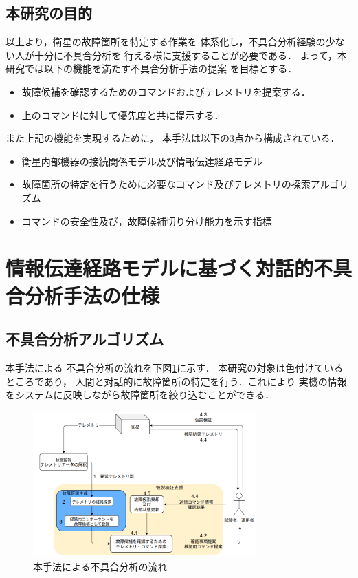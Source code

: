 \documentclass[11pt]{jsarticle}%
\begin{document}
\begin{multicols}{2}
\subsection{本研究の目的}
\vspace{-1zh}
以上より，衛星の故障箇所を特定する作業を
体系化し，不具合分析経験の少ない人が十分に不具合分析を
行える様に支援することが必要である．
よって，本研究では以下の機能を満たす不具合分析手法の提案%
を目標とする．%
  \begin{itemize}
  \item 故障候補を確認するためのコマンドおよびテレメトリを提案する．
  \item 上のコマンドに対して優先度と共に提示する．
\end{itemize}
また上記の機能を実現するために，
本手法は以下の3点から構成されている．
\begin{itemize}
  \item 衛星内部機器の接続関係モデル及び情報伝達経路モデル
  \item 故障箇所の特定を行うために必要なコマンド及びテレメトリの探索アルゴリズム
  \item コマンドの安全性及び，故障候補切り分け能力を示す指標
\end{itemize}
\vspace{-1zh}
\section{情報伝達経路モデルに基づく対話的不具合分析手法の仕様}
\vspace{-1zh}
\subsection{不具合分析アルゴリズム}
\vspace{-1zh}
本手法による
不具合分析の流れを下図\ref{fig:fault_diagnosis_flow}に示す．
本研究の対象は色付けているところであり，
人間と対話的に故障箇所の特定を行う．これにより %
実機の情報をシステムに反映しながら故障箇所を絞り込むことができる．
\begin{figure}[H]
  \centering
    \includegraphics[height=5.6cm]{../figure/fault_diagnosis_flow.png}
    \caption{本手法による不具合分析の流れ}
    \label{fig:fault_diagnosis_flow}
\end{figure}


\end{multicols}
\end{document}
